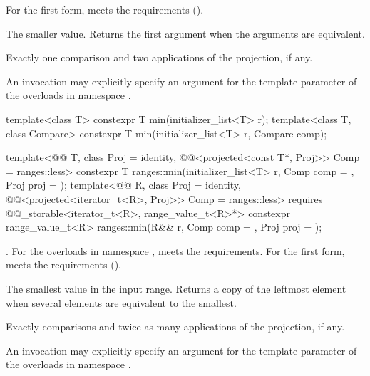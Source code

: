 \begin{itemdescr}
\pnum
\expects
For the first form,  meets the
 requirements ().

\pnum
\returns
The smaller value.
Returns the first argument when the arguments are equivalent.

\pnum
\complexity
Exactly one comparison and two applications of the projection, if any.

\pnum
\remarks
An invocation may explicitly specify
an argument for the template parameter 
of the overloads in namespace .
\end{itemdescr}

%
\begin{itemdecl}
template<class T>
  constexpr T min(initializer_list<T> r);
template<class T, class Compare>
  constexpr T min(initializer_list<T> r, Compare comp);

template<@@ T, class Proj = identity,
         @@<projected<const T*, Proj>> Comp = ranges::less>
  constexpr T ranges::min(initializer_list<T> r, Comp comp = {}, Proj proj = {});
template<@@ R, class Proj = identity,
         @@<projected<iterator_t<R>, Proj>> Comp = ranges::less>
  requires @@_storable<iterator_t<R>, range_value_t<R>*>
  constexpr range_value_t<R>
    ranges::min(R&& r, Comp comp = {}, Proj proj = {});
\end{itemdecl}

\begin{itemdescr}
\pnum
\expects
{}.
For the overloads in namespace ,
 meets the  requirements.
For the first form,  meets the 
requirements ().

\pnum
\returns
The smallest value in the input range.
Returns a copy of the leftmost element
when several elements are equivalent to the smallest.

\pnum
\complexity
Exactly  comparisons
and twice as many applications of the projection, if any.

\pnum
\remarks
An invocation may explicitly specify
an argument for the template parameter 
of the overloads in namespace .
\end{itemdescr}

